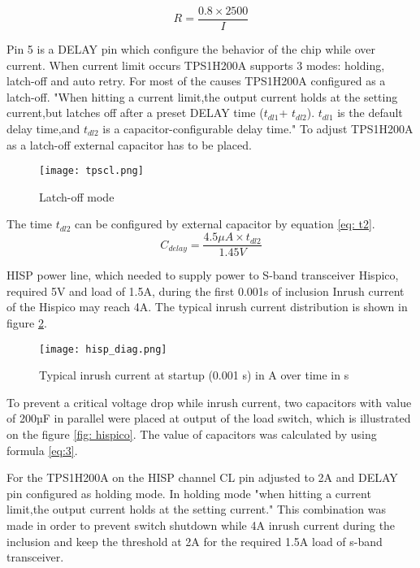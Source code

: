 \begin{equation}\label{eq: res}
R = \frac{0.8 \times 2500}{I}
\end{equation}


Pin 5 is a DELAY pin which configure the behavior of the chip while over current. When current limit occurs TPS1H200A supports 3 modes: holding, latch-off and auto retry. For most of the causes TPS1H200A configured as a latch-off. \cite{28} "When hitting a current limit,the output current holds at the setting current,but latches off after a preset DELAY time ($t_{dl1}$+ $t_{dl2}$). $t_{dl1}$ is the default delay time,and $t_{dl2}$ is a capacitor-configurable delay time." To adjust TPS1H200A as a latch-off external capacitor has to be placed. 

\begin{figure}[h]
	\centering
	\texttt{[image: tpscl.png]}
	\caption{Latch-off mode}
	\label{fig: tpscl}
\end{figure} 

The time $t_{dl2}$ can be configured by external capacitor by equation \ref{eq: t2}.  \\

\begin{equation} \label{eq: t2}
C_{delay} = \frac{4.5\mu A \times t_{dl2}}{1.45V} 
\end{equation}



 HISP power line, which needed to supply power to S-band transceiver Hispico, required 5V and load of 1.5A, during the first 0.001s of inclusion Inrush current of the Hispico may reach 4A. The typical inrush current distribution is shown in figure \ref{fig: hisp_inr}.

\begin{figure}[h]
	\centering
	\texttt{[image: hisp\_diag.png]}
	\caption{Typical inrush current at startup (0.001 s) in A over time in s}
	\label{fig: hisp_inr}
\end{figure} 

To prevent a critical voltage drop while inrush current, two capacitors with value of 200µF in parallel were placed at output of the load switch, which is illustrated on the figure \ref{fig: hispico}. The value of capacitors was calculated by using formula \ref{eq:3}.

For the TPS1H200A on the HISP channel CL pin adjusted to 2A and DELAY pin configured as holding mode. In holding mode \cite{28}"when hitting a current limit,the output current holds at the setting current." This combination was made in order to prevent switch shutdown while 4A inrush current during the inclusion and keep the threshold at 2A for the required 1.5A load of s-band transceiver. 
 
